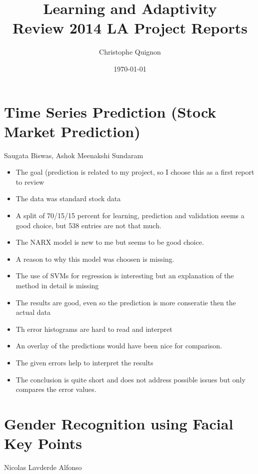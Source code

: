\documentclass[	DIV=calc,%
				paper=a4,%
				fontsize=11pt,%
				twocolumn]{scrartcl}	 %
\title{Learning and Adaptivity
\\ Review 2014 LA Project Reports}%
\author{Christophe Quignon }	%
\date{\today}
\newcommand{\initial}[1]{%
     \lettrine[lines=3,lhang=0.3,nindent=0em]{
     				\color{brsublue}
     				{\textsf{#1}}}{}}
\begin{document}
\maketitle
\thispagestyle{fancy} %
\section{Time Series Prediction (Stock Market Prediction)}
Saugata Biswas, Ashok Meenakshi Sundaram

\begin{itemize}
\item The goal (prediction is related to my project, so I choose this as a first report to review
\item The data was standard stock data
\item A split of 70/15/15 percent for learning, prediction and validation seems a good choice, but 538 entries are not that much.
\item The NARX model is new to me but seems to be good choice.
\item A reason to why this model was choosen is missing.
\item The use of SVMs for regression is interesting but an explanation of the method in detail is missing
\item The results are good, even so the prediction is more conseratie then the actual data
\item Th error histograms are hard to read and interpret
\item An overlay of the predictions would have been nice for comparison.\
\item The given errors help to interpret the results
\item The conclusion is quite short and does not address possible issues but only compares the error values. 
\end{itemize}

\section{Gender Recognition using Facial Key
Points
}
Nicolas Lavderde Alfonso
\end{document}
